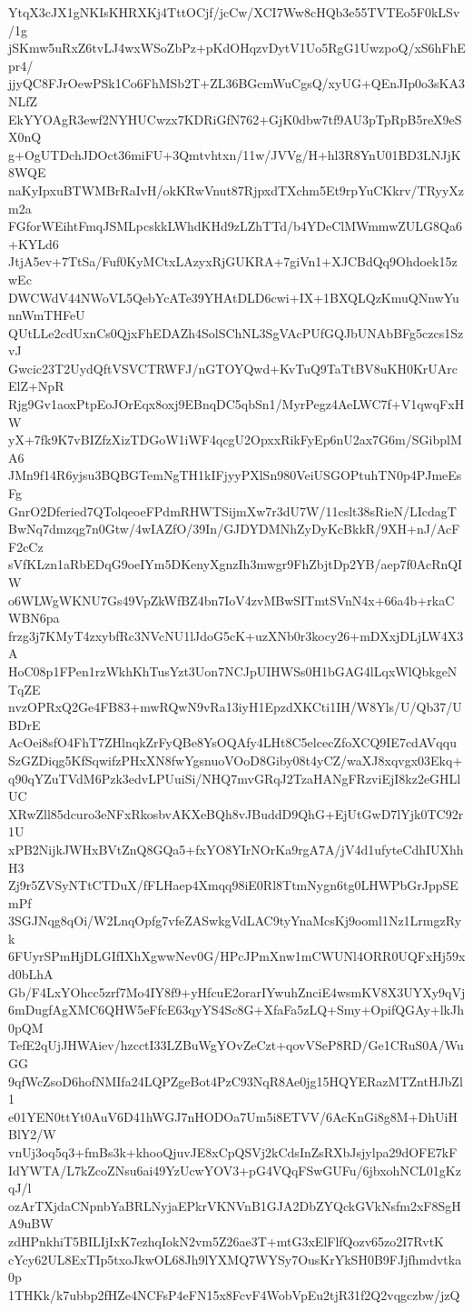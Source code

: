 YtqX3cJX1gNKIsKHRXKj4TttOCjf/jcCw/XCI7Ww8cHQb3e55TVTEo5F0kLSv/1g
jSKmw5uRxZ6tvLJ4wxWSoZbPz+pKdOHqzvDytV1Uo5RgG1UwzpoQ/xS6hFhEpr4/
jjyQC8FJrOewPSk1Co6FhMSb2T+ZL36BGcmWuCgsQ/xyUG+QEnJIp0o3sKA3NLfZ
EkYYOAgR3ewf2NYHUCwzx7KDRiGfN762+GjK0dbw7tf9AU3pTpRpB5reX9eSX0nQ
g+OgUTDchJDOct36miFU+3Qmtvhtxn/11w/JVVg/H+hl3R8YnU01BD3LNJjK8WQE
naKyIpxuBTWMBrRaIvH/okKRwVnut87RjpxdTXchm5Et9rpYuCKkrv/TRyyXzm2a
FGforWEihtFmqJSMLpcskkLWhdKHd9zLZhTTd/b4YDeClMWmmwZULG8Qa6+KYLd6
JtjA5ev+7TtSa/Fuf0KyMCtxLAzyxRjGUKRA+7giVn1+XJCBdQq9Ohdoek15zwEc
DWCWdV44NWoVL5QebYcATe39YHAtDLD6cwi+IX+1BXQLQzKmuQNnwYunnWmTHFeU
QUtLLe2cdUxnCs0QjxFhEDAZh4SolSChNL3SgVAcPUfGQJbUNAbBFg5czcs1SzvJ
Gwcic23T2UydQftVSVCTRWFJ/nGTOYQwd+KvTuQ9TaTtBV8uKH0KrUArcElZ+NpR
Rjg9Gv1aoxPtpEoJOrEqx8oxj9EBnqDC5qbSn1/MyrPegz4AeLWC7f+V1qwqFxHW
yX+7fk9K7vBIZfzXizTDGoW1iWF4qcgU2OpxxRikFyEp6nU2ax7G6m/SGibplMA6
JMn9f14R6yjsu3BQBGTemNgTH1kIFjyyPXlSn980VeiUSGOPtuhTN0p4PJmeEsFg
GnrO2Dferied7QTolqeoeFPdmRHWTSijmXw7r3dU7W/11cslt38sRieN/LIcdagT
BwNq7dmzqg7n0Gtw/4wIAZfO/39In/GJDYDMNhZyDyKcBkkR/9XH+nJ/AcFF2cCz
sVfKLzn1aRbEDqG9oeIYm5DKenyXgnzIh3mwgr9FhZbjtDp2YB/aep7f0AcRnQIW
o6WLWgWKNU7Gs49VpZkWfBZ4bn7IoV4zvMBwSITmtSVnN4x+66a4b+rkaCWBN6pa
frzg3j7KMyT4zxybfRc3NVcNU1lJdoG5cK+uzXNb0r3kocy26+mDXxjDLjLW4X3A
HoC08p1FPen1rzWkhKhTusYzt3Uon7NCJpUIHWSs0H1bGAG4lLqxWlQbkgeNTqZE
nvzOPRxQ2Ge4FB83+mwRQwN9vRa13iyH1EpzdXKCti1IH/W8Yls/U/Qb37/UBDrE
AcOei8sfO4FhT7ZHlnqkZrFyQBe8YsOQAfy4LHt8C5elcecZfoXCQ9IE7cdAVqqu
SzGZDiqg5KfSqwifzPHxXN8fwYgsnuoVOoD8Giby08t4yCZ/waXJ8xqvgx03Ekq+
q90qYZuTVdM6Pzk3edvLPUuiSi/NHQ7mvGRqJ2TzaHANgFRzviEjI8kz2eGHLlUC
XRwZll85dcuro3eNFxRkosbvAKXeBQh8vJBuddD9QhG+EjUtGwD7lYjk0TC92r1U
xPB2NijkJWHxBVtZnQ8GQa5+fxYO8YIrNOrKa9rgA7A/jV4d1ufyteCdhIUXhhH3
Zj9r5ZVSyNTtCTDuX/fFLHaep4Xmqq98iE0Rl8TtmNygn6tg0LHWPbGrJppSEmPf
3SGJNqg8qOi/W2LnqOpfg7vfeZASwkgVdLAC9tyYnaMcsKj9ooml1Nz1LrmgzRyk
6FUyrSPmHjDLGIfIXhXgwwNev0G/HPcJPmXnw1mCWUNl4ORR0UQFxHj59xd0bLhA
Gb/F4LxYOhcc5zrf7Mo4IY8f9+yHfcuE2orarIYwuhZnciE4wsmKV8X3UYXy9qVj
6mDugfAgXMC6QHW5eFfcE63qyYS4Sc8G+XfaFa5zLQ+Smy+OpifQGAy+lkJh0pQM
TefE2qUjJHWAiev/hzcctI33LZBuWgYOvZeCzt+qovVSeP8RD/Ge1CRuS0A/WuGG
9qfWcZsoD6hofNMIfa24LQPZgeBot4PzC93NqR8Ae0jg15HQYERazMTZntHJbZl1
e01YEN0ttYt0AuV6D41hWGJ7nHODOa7Um5i8ETVV/6AcKnGi8g8M+DhUiHBlY2/W
vnUj3oq5q3+fmBs3k+khooQjuvJE8xCpQSVj2kCdsInZsRXbJsjylpa29dOFE7kF
IdYWTA/L7kZcoZNsu6ai49YzUcwYOV3+pG4VQqFSwGUFu/6jbxohNCL01gKzqJ/l
ozArTXjdaCNpnbYaBRLNyjaEPkrVKNVnB1GJA2DbZYQckGVkNsfm2xF8SgHA9uBW
zdHPnkhiT5BILIjIxK7ezhqIokN2vm5Z26ae3T+mtG3xElFlfQozv65zo2I7RvtK
cYcy62UL8ExTIp5txoJkwOL68Jh9lYXMQ7WYSy7OusKrYkSH0B9FJjfhmdvtka0p
1THKk/k7ubbp2fHZe4NCFsP4eFN15x8FcvF4WobVpEu2tjR31f2Q2vqgczbw/jzQ
